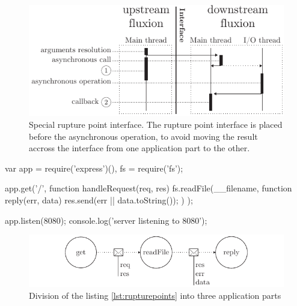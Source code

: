 \begin{figure}[h!]
\begin{center}
  \includegraphics[width=\linewidth]{ressources/specialrp.pdf}
  \caption{Special rupture point interface. \textnormal{The rupture point interface is placed before the asynchronous operation, to avoid moving the result accross the interface from one application part to the other.}}
  \label{fig:specialrp}
\end{center}
\end{figure}

\begin{code}[js, caption={Example of an application presenting the two types of rupture points : a \texttt{start} with the call to \texttt{app.get()}, and a \texttt{post} with the call to \texttt{fs.readFile()}},label={lst:rupturepoints}]
var app = require('express')(),
    fs = require('fs');

app.get('/', function handleRequest(req, res) {
  fs.readFile(__filename, function reply(err, data) {
    res.send(err || data.toString());
  })
});

app.listen(8080);
console.log('server listening to 8080');
\end{code}

\begin{figure}[h!]
\begin{center}
  \includegraphics[width=\linewidth]{ressources/flux-2.pdf}
  \caption{Division of the listing \ref{lst:rupturepoints} into three application parts}
  \label{fig:flux-1}
\end{center}
\end{figure}


